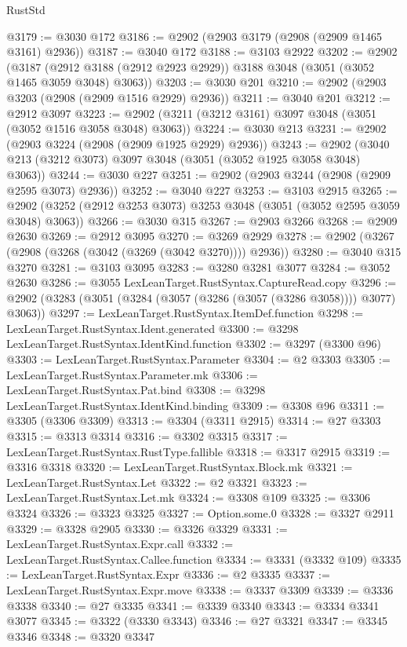 \begin{lexlean}{RustStd}
\begin{coremodule}
@3179 := @3030 @172
@3186 := @2902 (@2903 @3179 (@2908 (@2909 @1465 @3161) @2936))
@3187 := @3040 @172
@3188 := @3103 @2922
@3202 := @2902
    (@3187 (@2912 @3188 (@2912 @2923 @2929)) @3188 @3048 (@3051 (@3052 @1465 @3059 @3048) @3063))
@3203 := @3030 @201
@3210 := @2902 (@2903 @3203 (@2908 (@2909 @1516 @2929) @2936))
@3211 := @3040 @201
@3212 := @2912 @3097
@3223 := @2902 (@3211 (@3212 @3161) @3097 @3048 (@3051 (@3052 @1516 @3058 @3048) @3063))
@3224 := @3030 @213
@3231 := @2902 (@2903 @3224 (@2908 (@2909 @1925 @2929) @2936))
@3243 := @2902 (@3040 @213 (@3212 @3073) @3097 @3048 (@3051 (@3052 @1925 @3058 @3048) @3063))
@3244 := @3030 @227
@3251 := @2902 (@2903 @3244 (@2908 (@2909 @2595 @3073) @2936))
@3252 := @3040 @227
@3253 := @3103 @2915
@3265 := @2902 (@3252 (@2912 @3253 @3073) @3253 @3048 (@3051 (@3052 @2595 @3059 @3048) @3063))
@3266 := @3030 @315
@3267 := @2903 @3266
@3268 := @2909 @2630
@3269 := @2912 @3095
@3270 := @3269 @2929
@3278 := @2902 (@3267 (@2908 (@3268 (@3042 (@3269 (@3042 @3270)))) @2936))
@3280 := @3040 @315 @3270
@3281 := @3103 @3095
@3283 := @3280 @3281 @3077
@3284 := @3052 @2630
@3286 := @3055 LexLeanTarget.RustSyntax.CaptureRead.copy
@3296 := @2902 (@3283 (@3051 (@3284 (@3057 (@3286 (@3057 (@3286 @3058)))) @3077) @3063))
@3297 := LexLeanTarget.RustSyntax.ItemDef.function
@3298 := LexLeanTarget.RustSyntax.Ident.generated
@3300 := @3298 LexLeanTarget.RustSyntax.IdentKind.function
@3302 := @3297 (@3300 @96)
@3303 := LexLeanTarget.RustSyntax.Parameter
@3304 := @2 @3303
@3305 := LexLeanTarget.RustSyntax.Parameter.mk
@3306 := LexLeanTarget.RustSyntax.Pat.bind
@3308 := @3298 LexLeanTarget.RustSyntax.IdentKind.binding
@3309 := @3308 @96
@3311 := @3305 (@3306 @3309)
@3313 := @3304 (@3311 @2915)
@3314 := @27 @3303
@3315 := @3313 @3314
@3316 := @3302 @3315
@3317 := LexLeanTarget.RustSyntax.RustType.fallible
@3318 := @3317 @2915
@3319 := @3316 @3318
@3320 := LexLeanTarget.RustSyntax.Block.mk
@3321 := LexLeanTarget.RustSyntax.Let
@3322 := @2 @3321
@3323 := LexLeanTarget.RustSyntax.Let.mk
@3324 := @3308 @109
@3325 := @3306 @3324
@3326 := @3323 @3325
@3327 := Option.some.{0}
@3328 := @3327 @2911
@3329 := @3328 @2905
@3330 := @3326 @3329
@3331 := LexLeanTarget.RustSyntax.Expr.call
@3332 := LexLeanTarget.RustSyntax.Callee.function
@3334 := @3331 (@3332 @109)
@3335 := LexLeanTarget.RustSyntax.Expr
@3336 := @2 @3335
@3337 := LexLeanTarget.RustSyntax.Expr.move
@3338 := @3337 @3309
@3339 := @3336 @3338
@3340 := @27 @3335
@3341 := @3339 @3340
@3343 := @3334 @3341 @3077
@3345 := @3322 (@3330 @3343)
@3346 := @27 @3321
@3347 := @3345 @3346
@3348 := @3320 @3347

\end{coremodule}
\end{lexlean}
